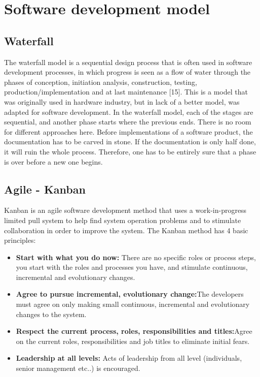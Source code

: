 \section{Software development model}

\subsection{Waterfall}
The waterfall model is a sequential design process that is often used in software development processes, in which progress is seen as a flow of water through the phases of conception, initiation analysis, construction, testing, production/implementation and at last maintenance [15]. 
\newline
\newline
This is a model that was originally used in hardware industry, but in lack of a better model, was adapted for software development. In the waterfall model, each of the stages are sequential, and another phase starts where the previous ends. There is no room for different approaches here. Before implementations of a software product, the documentation has to be carved in stone. If the documentation is only half done, it will ruin the whole process. Therefore, one has to be entirely sure that a phase is over before a new one begins. 

\subsection{Agile - Kanban}
Kanban is an agile software development method that uses a work-in-progress limited pull system to help find system operation problems and to stimulate collaboration in order to improve the system.
\newline
The Kanban method has 4 basic principles:
\begin{itemize}
\item{}\textbf{Start with what you do now:} There are no specific roles or process steps, you start with the roles and processes you have, and stimulate continuous, incremental and evolutionary changes.
\item{}\textbf{Agree to pursue incremental, evolutionary change:}The developers must agree on only making small continuous, incremental and evolutionary changes to the system.
\item{}\textbf{Respect the current process, roles, responsibilities and titles:}Agree on the current roles, responsibilities and job titles to eliminate initial fears.
\item{}\textbf{Leadership at all levels:} Acts of leadership from all level (individuals, senior management etc..) is encouraged.
\end{itemize}


